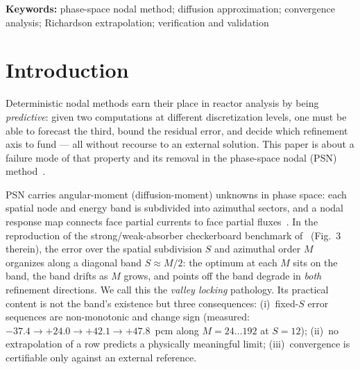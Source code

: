 \documentclass[11pt,a4paper]{article}
\begin{document}
\begin{abstract}
method converges monotonically and single-signed at $O(M^{-2})$ to a
limit that \emph{is} the pure spatial residual.  Consequently the
Richardson $M\to\infty$ limit predicted from $M=48/96$ alone matches
the $M=384$ measurement within $0.6$~pcm --- 40-row reference-free
prediction with a self-reported error bar --- while the legacy
sequences, however extrapolated, converge to an operator-error
plateau ($+49.7$~pcm at $S{=}12$) that is only visible against an
external Monte Carlo reference.  Error predictability, not accuracy at
the best tunable point, is the operative property for qualification.
It is a conditional statement --- a consistent operator implies a
separable single-channel error implies Richardson-validity on both
axes --- and the strict closure establishes the antecedent
analytically (body$\equiv$face, by construction); the sweeps
demonstrate the consequents.
\end{abstract}

\noindent\textbf{Keywords:} phase-space nodal method; diffusion
approximation; convergence analysis; Richardson
extrapolation; verification and validation

\section{Introduction}
\label{sec:intro}

Deterministic nodal methods earn their place in reactor analysis by
being \emph{predictive}: given two computations at different
discretization levels, one must be able to forecast the third, bound
the residual error, and decide which refinement axis to fund --- all
without recourse to an external solution.  This paper is about a
failure mode of that property and its removal in the phase-space nodal
(PSN) method~\cite{chao2027}.

PSN carries angular-moment (diffusion-moment) unknowns in phase space:
each spatial node and energy band is subdivided into azimuthal sectors,
and a nodal response map connects face partial currents to face
partial fluxes~\cite{chao2027}.  In the reproduction of the
strong/weak-absorber checkerboard benchmark of~\cite{chao2027}
(Fig.~3 therein), the error over the spatial subdivision $S$ and
azimuthal order $M$ organizes along a diagonal band $S \approx M/2$:
the optimum at each $M$ sits on the band, the band drifts as $M$
grows, and points off the band degrade in \emph{both} refinement
directions.  We call this the \emph{valley locking} pathology.  Its
practical content is not the band's existence but three consequences:
(i)~fixed-$S$ error sequences are non-monotonic and change sign
(measured: $-37.4 \to +24.0 \to +42.1 \to +47.8$~pcm along
$M=24\ldots192$ at $S{=}12$); (ii)~no extrapolation of a row predicts
a physically meaningful limit; (iii)~convergence is certifiable only
against an external reference.
\end{document}
